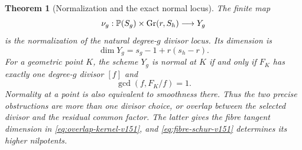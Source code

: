\documentclass[11pt,reqno]{amsart}
\numberwithin{equation}{section}
\newtheorem{theorem}{Theorem}[section]
\theoremstyle{definition}\newtheorem{definition}[theorem]{Definition}
\theoremstyle{remark}\newtheorem{remark}[theorem]{Remark}
\newcommand{\Pj}{\mathbb P}\newcommand{\A}{\mathbb A}
\begin{document}
\begin{theorem}[Normalization and the exact normal locus]
\label{thm:boundary-normalization-v151}
The finite map
\[
 \nu_g:\Pj(S_g)\times\Gr(r,S_h)\longrightarrow Y_g
\]
is the normalization of the natural degree-\(g\) divisor locus.
Its dimension is
\begin{equation}\label{eq:boundary-dimension-v151}
                    \dim Y_g=s_g-1+r(s_h-r).
\end{equation}
For a geometric point \(K\), the scheme \(Y_g\) is normal at \(K\)
if and only if \(F_K\) has exactly one degree-\(g\) divisor \([f]\)
and
\begin{equation}\label{eq:normal-criterion-v151}
                         \gcd(f,F_K/f)=1.
\end{equation}
Normality at a point is also equivalent to smoothness there.
Thus the two precise obstructions are more than one divisor choice,
or overlap between the selected divisor and the residual common
factor.  The latter gives the fibre tangent dimension in
\eqref{eq:overlap-kernel-v151}, and
\eqref{eq:fibre-schur-v151} determines its higher nilpotents.
\end{theorem}
\end{document}
